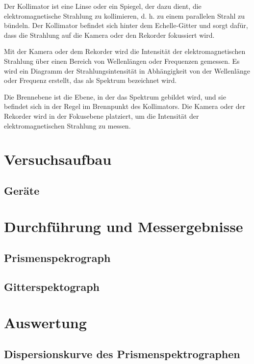 \documentclass[12pt,english,ngerman]{scrartcl}
\begin{document}
Der Kollimator ist eine Linse oder ein Spiegel, der dazu dient, die elektromagnetische Strahlung zu kollimieren, d. h. zu einem parallelen Strahl zu bündeln. Der Kollimator befindet sich hinter dem Echelle-Gitter und sorgt dafür, dass die Strahlung auf die Kamera oder den Rekorder fokussiert wird.

Mit der Kamera oder dem Rekorder wird die Intensität der elektromagnetischen Strahlung über einen Bereich von Wellenlängen oder Frequenzen gemessen. Es wird ein Diagramm der Strahlungsintensität in Abhängigkeit von der Wellenlänge oder Frequenz erstellt, das als Spektrum bezeichnet wird.

Die Brennebene ist die Ebene, in der das Spektrum gebildet wird, und sie befindet sich in der Regel im Brennpunkt des Kollimators. Die Kamera oder der Rekorder wird in der Fokusebene platziert, um die Intensität der elektromagnetischen Strahlung zu messen.




\section{Versuchsaufbau} \label{sec:aufbau}



\subsection{Geräte}



\section{Durchführung und Messergebnisse}\label{sec:durchführung}

\subsection{Prismenspekrograph}

\subsection{Gitterspektograph}


\section{Auswertung}\label{sec:auswertung}


\subsection{Dispersionskurve des Prismenspektrographen}
\end{document}
